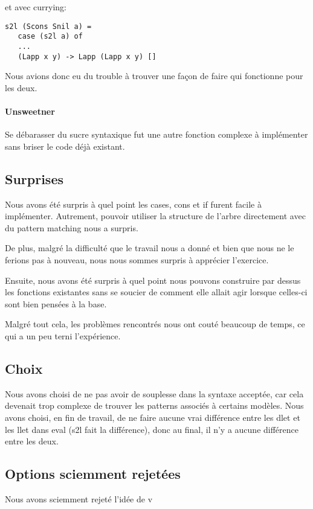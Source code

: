 et avec currying:

\begin{verbatim}
s2l (Scons Snil a) =
   case (s2l a) of
   ...
   (Lapp x y) -> Lapp (Lapp x y) []
\end{verbatim}

Nous avions donc eu du trouble à trouver une façon de faire qui
fonctionne pour les deux.

\paragraph{Unsweetner}\label{unsweetner}

Se débarasser du sucre syntaxique fut une autre fonction complexe à
implémenter sans briser le code déjà existant.

\subsection{Surprises}\label{surprises}

Nous avons été surpris à quel point les cases, cons et if furent facile
à implémenter. Autrement, pouvoir utiliser la structure de l'arbre
directement avec du pattern matching nous a surpris.

De plus, malgré la difficulté que le travail nous a donné et bien que
nous ne le ferions pas à nouveau, nous nous sommes surpris à apprécier
l'exercice.

Ensuite, nous avons été surpris à quel point nous pouvons construire par
dessus les fonctions existantes sans se soucier de comment elle allait
agir lorsque celles-ci sont bien pensées à la base.

Malgré tout cela, les problèmes rencontrés nous ont couté beaucoup de
temps, ce qui a un peu terni l'expérience.

\subsection{Choix}\label{choix}

Nous avons choisi de ne pas avoir de souplesse dans la syntaxe acceptée,
car cela devenait trop complexe de trouver les patterns associés à
certains modèles. Nous avons choisi, en fin de travail, de ne faire
aucune vrai différence entre les dlet et les llet dans eval (s2l fait la
différence), donc au final, il n'y a aucune différence entre les deux.

\subsection{Options sciemment
rejetées}\label{options-sciemment-rejetuxe9es}

Nous avons sciemment rejeté l'idée de v

